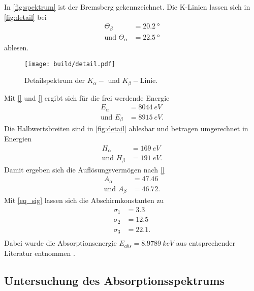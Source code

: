 In \autoref{fig:spektrum} ist der Bremsberg gekennzeichnet. Die K-Linien lassen sich in \autoref{fig:detail} bei 
\begin{align*}
  \Theta_{\beta} &= \SI{20.2}{°} \\
  \text{und }\Theta_{\alpha} &= \SI{22.5}{°}
\end{align*}
ablesen.
\begin{figure}[H]
  \texttt{[image: build/detail.pdf]}
  \caption{Detailspektrum der $K_{\alpha}-$ und $K_{\beta}-$Linie.}
  \label{fig:detail}
\end{figure}
Mit \autoref{} und \autoref{} ergibt sich für die frei werdende Energie
\begin{align*}
  E_{\alpha} &= \SI{8044}{eV} \\
  \text{und }E_{\beta} &= \SI{8915}{eV}.
\end{align*}
Die Halbwertsbreiten sind in \autoref{fig:detail} ablesbar und betragen umgerechnet in Energien
\begin{align*}
  H_{\alpha} &= \SI{169}{eV} \\
  \text{und }H_{\beta} &= \SI{191}{eV}.
\end{align*}
Damit ergeben sich die Auflösungsvermögen nach \autoref{}
\begin{align*}
  A_{\alpha} &= 47.46 \\
  \text{und }A_{\beta} &= 46.72.
\end{align*}
Mit \autoref{eq_sig} lassen sich die Abschirmkonstanten zu
\begin{align*}
  σ_1 &= 3.3\\
  σ_2 &= 12.5\\
  σ_3 &= 22.1.\\
\end{align*}
Dabei wurde die Absorptionsenergie $E_{abs} = \SI{8.9789}{keV}$ aus entsprechender Literatur entnommen \cite{E_abs}.

\subsection{Untersuchung des Absorptionsspektrums}
